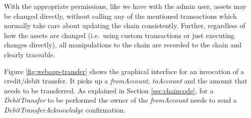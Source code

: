 With the appropriate permissions, like we have with the admin user, assets may be changed directly, without calling any of the mentioned transactions which normally take care about updating the chain consistently. Further, regardless of how the assets are changed (i.e.\ using custom transactions or just executing changes directly), all manipulations to the chain are recorded to the chain and clearly traceable.

Figure \ref{fig:webapp-transfer} shows the graphical interface for an invocation of a credit/debit transfer. It picks up a \textit{fromAccount}, \textit{toAccount} and the amount that needs to be transferred. As explained in Section \ref{sec:chaincode}, for a \textit{DebitTransfer} to be performed the owner of the \textit{fromAccount} needs to send a \textit{DebitTransferAcknowledge} confirmation.



